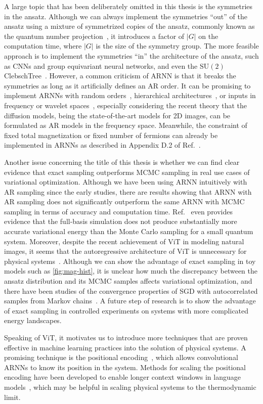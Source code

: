 A large topic that has been deliberately omitted in this thesis is the symmetries in the ansatz. Although we can always implement the symmetries ``out'' of the ansatz using a mixture of symmetrized copies of the ansatz, commonly known as the quantum number projection~\cite{tahara2008variational}, it introduces a factor of $|G|$ on the computation time, where $|G|$ is the size of the symmetry group. The more feasible approach is to implement the symmetries ``in'' the architecture of the ansatz, such as CNNs and group equivariant neural networks, and even the $\mathrm{SU}(2)$ ClebschTree~\cite{vieijra2021many}. However, a common criticism of ARNN is that it breaks the symmetries as long as it artificially defines an AR order. It can be promising to implement ARNNs with random orders~\cite{hoogeboom2022autoregressive, pannatier2024sigma, yu2024randomized}, hierarchical architectures~\cite{bialas2022hierarchical, tian2024visual}, or inputs in frequency or wavelet spaces~\cite{nash2021generating, mattar2024wavelets}, especially considering the recent theory that the diffusion models, being the state-of-the-art models for 2D images, can be formulated as AR models in the frequency space. Meanwhile, the constraint of fixed total magnetization or fixed number of fermions can already be implemented in ARNNs as described in Appendix D.2 of Ref.~\cite{hibat2020recurrent}.

Another issue concerning the title of this thesis is whether we can find clear evidence that exact sampling outperforms MCMC sampling in real use cases of variational optimization. Although we have been using ARNN intuitively with AR sampling since the early studies, there are results showing that ARNN with AR sampling does not significantly outperform the same ARNN with MCMC sampling in terms of accuracy and computation time. Ref.~\cite{bukov2021learning} even provides evidence that the full-basis simulation does not produce substantially more accurate variational energy than the Monte Carlo sampling for a small quantum system. Moreover, despite the recent achievement of ViT in modeling natural images, it seems that the autoregressive architecture of ViT is unnecessary for physical systems~\cite{viteritti2023transformer, rende2024queries}. Although we can show the advantage of exact sampling in toy models such as \cref{fig:mag-hist}, it is unclear how much the discrepancy between the ansatz distribution and its MCMC samples affects variational optimization, and there have been studies of the convergence properties of SGD with autocorrelated samples from Markov chains~\cite{sun2018markov}. A future step of research is to show the advantage of exact sampling in controlled experiments on systems with more complicated energy landscapes.

Speaking of ViT, it motivates us to introduce more techniques that are proven effective in machine learning practices into the solution of physical systems. A promising technique is the positional encoding~\cite{ke2021rethinking}, which allows convolutional ARNNs to know its position in the system. Methods for scaling the positional encoding have been developed to enable longer context windows in language models~\cite{liu2024scaling, peng2024yarn}, which may be helpful in scaling physical systems to the thermodynamic limit.
